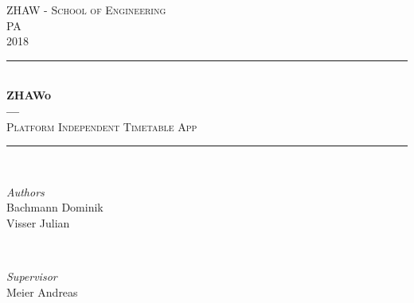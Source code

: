 
\begin{titlepage} %
	\newcommand{\HRule}{\rule{\linewidth}{0.5mm}} %

	\center %


	\textsc{\LARGE ZHAW - School of Engineering}\\[1.5cm] %

	\textsc{\Large PA}\\[0.5cm] %

	\textsc{\large 2018}\\[0.5cm] %


	\HRule\\[0.4cm]

	{\huge\bfseries ZHAWo \\
									--- \\}
	\textsc{\large Platform Independent Timetable App}\\[0.5cm]


	\HRule\\[1.5cm]


	\begin{minipage}{0.4\textwidth}
		\begin{flushleft}
			\large
			\textit{Authors}\\
			Bachmann Dominik \\
			Visser Julian %
		\end{flushleft}
	\end{minipage}
	~
	\begin{minipage}{0.4\textwidth}
		\begin{flushright}
			\large
			\textit{Supervisor}\\
			Meier Andreas %
		\end{flushright}
	\end{minipage}




\end{titlepage}

